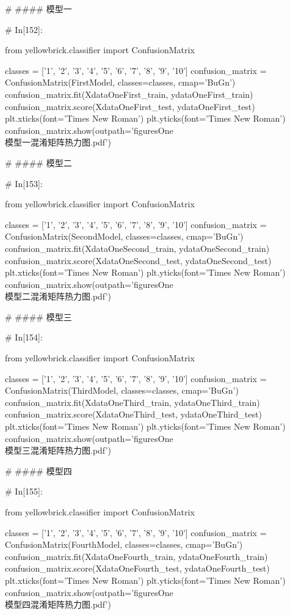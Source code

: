 \documentclass{MathorCupmodeling}
\begin{document}
\begin{python}
	# #### 模型一
	
	# In[152]:
	
	
	from yellowbrick.classifier import ConfusionMatrix
	
	classes = ['1', '2', '3', '4', '5', '6', '7', '8', '9', '10']
	confusion_matrix = ConfusionMatrix(FirstModel, classes=classes, cmap='BuGn')
	confusion_matrix.fit(XdataOneFirst_train, ydataOneFirst_train)
	confusion_matrix.score(XdataOneFirst_test, ydataOneFirst_test)
	plt.xticks(font='Times New Roman')
	plt.yticks(font='Times New Roman')
	confusion_matrix.show(outpath='figuresOne\\[附件1]模型一混淆矩阵热力图.pdf')
	
	# #### 模型二
	
	# In[153]:
	
	
	from yellowbrick.classifier import ConfusionMatrix
	
	classes = ['1', '2', '3', '4', '5', '6', '7', '8', '9', '10']
	confusion_matrix = ConfusionMatrix(SecondModel, classes=classes, cmap='BuGn')
	confusion_matrix.fit(XdataOneSecond_train, ydataOneSecond_train)
	confusion_matrix.score(XdataOneSecond_test, ydataOneSecond_test)
	plt.xticks(font='Times New Roman')
	plt.yticks(font='Times New Roman')
	confusion_matrix.show(outpath='figuresOne\\[附件1]模型二混淆矩阵热力图.pdf')
	
	# #### 模型三
	
	# In[154]:
	
	
	from yellowbrick.classifier import ConfusionMatrix
	
	classes = ['1', '2', '3', '4', '5', '6', '7', '8', '9', '10']
	confusion_matrix = ConfusionMatrix(ThirdModel, classes=classes, cmap='BuGn')
	confusion_matrix.fit(XdataOneThird_train, ydataOneThird_train)
	confusion_matrix.score(XdataOneThird_test, ydataOneThird_test)
	plt.xticks(font='Times New Roman')
	plt.yticks(font='Times New Roman')
	confusion_matrix.show(outpath='figuresOne\\[附件1]模型三混淆矩阵热力图.pdf')
	
	# #### 模型四
	
	# In[155]:
	
	
	from yellowbrick.classifier import ConfusionMatrix
	
	classes = ['1', '2', '3', '4', '5', '6', '7', '8', '9', '10']
	confusion_matrix = ConfusionMatrix(FourthModel, classes=classes, cmap='BuGn')
	confusion_matrix.fit(XdataOneFourth_train, ydataOneFourth_train)
	confusion_matrix.score(XdataOneFourth_test, ydataOneFourth_test)
	plt.xticks(font='Times New Roman')
	plt.yticks(font='Times New Roman')
	confusion_matrix.show(outpath='figuresOne\\[附件1]模型四混淆矩阵热力图.pdf')
	

\end{python}
\end{document}
